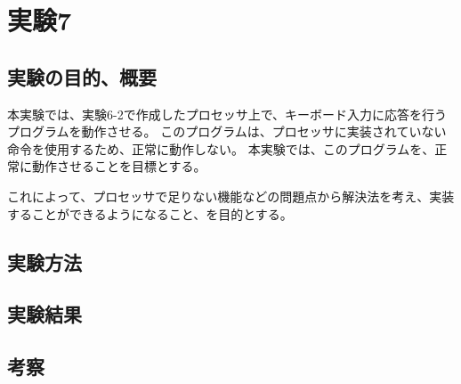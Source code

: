 \section{実験7}
\subsection{実験の目的、概要}
本実験では、実験6-2で作成したプロセッサ上で、キーボード入力に応答を行うプログラムを動作させる。
このプログラムは、プロセッサに実装されていない命令を使用するため、正常に動作しない。
本実験では、このプログラムを、正常に動作させることを目標とする。

これによって、プロセッサで足りない機能などの問題点から解決法を考え、実装することができるようになること、を目的とする。

\subsection{実験方法}

\subsection{実験結果}

\subsection{考察}
